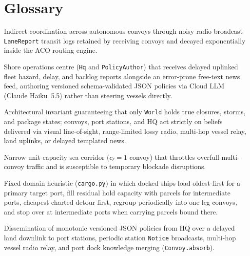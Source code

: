 \documentclass[11pt,a4paper,oneside]{report}
\begin{document}
\clearpage
\tableofcontents
\clearpage{}\listoffigures{}
\clearpage{}\listoftables{}

\clearpage{}
\chapter*{Glossary}
















\begin{description}[style=nextline, itemsep=5pt]
    \item[\textbf{Stigmergy}] Indirect coordination across autonomous convoys through noisy radio-broadcast \texttt{LaneReport} transit logs retained by receiving convoys and decayed exponentially inside the ACO routing engine.
    \item[\textbf{HQ Policy Author}] Shore operations centre (\texttt{Hq} and \texttt{PolicyAuthor}) that receives delayed uplinked fleet hazard, delay, and backlog reports alongside an error-prone free-text news feed, authoring versioned schema-validated JSON policies via Cloud LLM (Claude Haiku~5.5) rather than steering vessels directly.
    \item[\textbf{Information-Path Principle}] Architectural invariant guaranteeing that only \texttt{World} holds true closures, storms, and package states; convoys, port stations, and HQ act strictly on beliefs delivered via visual line-of-sight, range-limited lossy radio, multi-hop vessel relay, land uplinks, or delayed templated news.
    \item[\textbf{Single-File Strait}] Narrow unit-capacity sea corridor ($c_\ell = 1$ convoy) that throttles overfull multi-convoy traffic and is susceptible to temporary blockade disruptions.
    \item[\textbf{Loading on the Way \& Stopovers}] Fixed domain heuristic (\texttt{cargo.py}) in which docked ships load oldest-first for a primary target port, fill residual hold capacity with parcels for intermediate ports, cheapest charted detour first, regroup periodically into one-leg convoys, and stop over at intermediate ports when carrying parcels bound there.
    \item[\textbf{Versioned Policy Propagation}] Dissemination of monotonic versioned JSON policies from HQ over a delayed land downlink to port stations, periodic station \texttt{Notice} broadcasts, multi-hop vessel radio relay, and port dock knowledge merging (\texttt{Convoy.absorb}).
\end{description}
\end{document}
